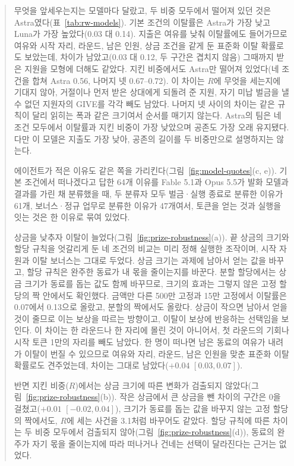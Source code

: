 \begin{quote}
{\color{black}무엇을 앞세우는지는 모델마다 달랐고, 두 비중 모두에서 떨어져 있던 것은 Astra였다(표~\ref{tab:rw-models}). 기본 조건의 이탈률은 Astra가 가장 낮고 Luna가 가장 높았다(0.03 대 0.14). 지출은 여유를 낮춰 이탈률에도 들어가므로 여유와 시작 자리, 라운드, 남은 인원, 상금 조건을 같게 둔 표준화 이탈 확률로도 보았는데, 차이가 남았고(0.03 대 0.12, 두 구간은 겹치지 않음) 그때까지 받은 지원을 모형에 더해도 같았다. 지킨 비중에서도 Astra만 떨어져 있었다(네 조건을 합쳐 Astra 0.56, 나머지 넷 0.67--0.72). 이 차이는 $R$에 무엇을 세는지에 기대지 않아, 거절이나 먼저 받은 상대에게 되돌려 준 지원, 자기 미납 벌금을 낼 수 없던 지원자의 GIVE를 각각 빼도 남았다. 나머지 넷 사이의 차이는 같은 규칙이 달리 읽히는 폭과 같은 크기여서 순서를 매기지 않는다. Astra의 팀은 네 조건 모두에서 이탈률과 지킨 비중이 가장 낮았으며 공존도 가장 오래 유지됐다. 다만 이 모델은 지출도 가장 낮아, 공존의 길이를 두 비중만으로 설명하지는 않는다.}

{\color{black}에이전트가 적은 이유도 같은 쪽을 가리킨다(그림~\ref{fig:model-quotes}(c, e)). 기본 조건에서 떠나겠다고 답한 64개 이유를 Fable 5.1과 Opus 5.5가 발화 모델과 결과를 가린 채 분류했을 때, 두 분류자 모두 벌금·실행 종료로 분류한 이유가 61개, 보너스·정규 업무로 분류한 이유가 47개여서, 토큰을 얻는 것과 실행을 잇는 것은 한 이유로 묶여 있었다.}

{\color{black}상금을 낮추자 이탈이 늘었다(그림~\ref{fig:prize-robustness}(a)). 끝 상금의 크기와 할당 규칙을 엇갈리게 둔 네 조건의 비교는 미리 정해 실행한 조작이며, 시작 자원과 이탈 보너스는 그대로 두었다. 상금 크기는 과제에 남아서 얻는 값을 바꾸고, 할당 규칙은 완주한 동료가 내 몫을 줄이는지를 바꾼다. 분할 할당에서는 상금 크기가 동료를 돕는 값도 함께 바꾸므로, 크기의 효과는 그렇지 않은 고정 할당의 짝 안에서도 확인했다. 금액만 다른 500만 고정과 15만 고정에서 이탈률은 0.07에서 0.13으로 올랐고, 분할의 짝에서도 올랐다. 상금이 작으면 남아서 얻을 것이 줄므로 이는 보상을 따르는 방향이고, 이탈이 보상에 반응하는 선택임을 보인다. 이 차이는 한 라운드나 한 자리에 몰린 것이 아니어서, 첫 라운드의 기회나 시작 토큰 1만의 자리를 빼도 남았다. 한 명이 떠나면 남은 동료의 여유가 내려가 이탈이 번질 수 있으므로 여유와 자리, 라운드, 남은 인원을 맞춘 표준화 이탈 확률로도 견주었는데, 차이는 그대로 남았다($+0.04$ $[0.03,0.07]$).}

{\color{black}반면 지킨 비중($R$)에서는 상금 크기에 따른 변화가 검출되지 않았다(그림~\ref{fig:prize-robustness}(b)). 작은 상금에서 큰 상금을 뺀 차이의 구간은 0을 걸쳤고($+0.01$ $[-0.02,0.04]$), 크기가 동료를 돕는 값을 바꾸지 않는 고정 할당의 짝에서도, $R$에 세는 사건을 3.1처럼 바꾸어도 같았다. 할당 규칙에 따른 차이는 두 비중 모두에서 검출되지 않아(그림~\ref{fig:prize-robustness}(d)), 동료의 완주가 자기 몫을 줄이는지에 따라 떠나거나 건네는 선택이 달라진다는 근거는 없었다.}


\end{quote}
